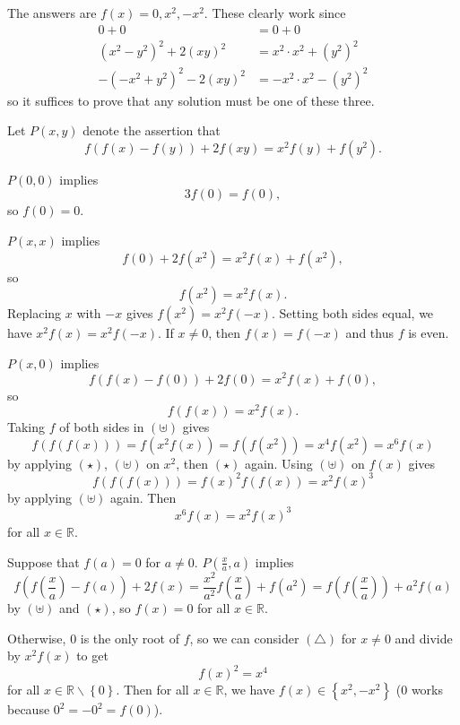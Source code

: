 The answers are $f\left(x\right)=\boxed{0,x^2,-x^2}$. These clearly work since
\begin{align*}
	0+0&=0+0\\
	\left(x^2-y^2\right)^2+2\left(xy\right)^2&=x^2\cdot x^2+\left(y^2\right)^2\\
	-\left(-x^2+y^2\right)^2-2\left(xy\right)^2&=-x^2\cdot x^2-\left(y^2\right)^2
\end{align*}
so it suffices to prove that any solution must be one of these three.

Let $P\left(x,y\right)$ denote the assertion that \[f\left(f\left(x\right)-f\left(y\right)\right)+2f\left(xy\right)=x^2f\left(y\right)+f\left(y^2\right).\]

$P\left(0,0\right)$ implies \[3f\left(0\right)=f\left(0\right),\] so $f\left(0\right)=0$.

$P\left(x,x\right)$ implies \[f\left(0\right)+2f\left(x^2\right)=x^2f\left(x\right)+f\left(x^2\right),\] so \[f\left(x^2\right)=x^2f\left(x\right).\tag{$\star$}\] Replacing $x$ with $-x$ gives $f\left(x^2\right)=x^2f\left(-x\right)$. Setting both sides equal, we have $x^2f\left(x\right)=x^2f\left(-x\right)$. If $x\neq0$, then $f\left(x\right)=f\left(-x\right)$ and thus $f$ is even.

$P\left(x,0\right)$ implies \[f\left(f\left(x\right)-f\left(0\right)\right)+2f\left(0\right)=x^2f\left(x\right)+f\left(0\right),\] so \[f\left(f\left(x\right)\right)=x^2f\left(x\right)\tag{$\uplus$}.\] Taking $f$ of both sides in $(\uplus)$ gives \[f\left(f\left(f\left(x\right)\right)\right)=f\left(x^2f\left(x\right)\right)=f\left(f\left(x^2\right)\right)=x^4f\left(x^2\right)=x^6f\left(x\right)\] by applying $(\star)$, $(\uplus)$ on $x^2$, then $(\star)$ again. Using $(\uplus)$ on $f\left(x\right)$ gives \[f\left(f\left(f\left(x\right)\right)\right)=f\left(x\right)^2f\left(f\left(x\right)\right)=x^2f\left(x\right)^3\] by applying $(\uplus)$ again. Then \[x^6f\left(x\right)=x^2f\left(x\right)^3\tag{$\triangle$}\] for all $x\in\mathbb{R}$.

Suppose that $f\left(a\right)=0$ for $a\neq0$. $P\left(\frac{x}{a},a\right)$ implies \[f\left(f\left(\frac{x}{a}\right)-f\left(a\right)\right)+2f\left(x\right)=\frac{x^2}{a^2}f\left(\frac{x}{a}\right)+f\left(a^2\right)=f\left(f\left(\frac{x}{a}\right)\right)+a^2f\left(a\right)\] by $(\uplus)$ and $(\star)$, so $f\left(x\right)=0$ for all $x\in\mathbb{R}$.

Otherwise, $0$ is the only root of $f$, so we can consider $(\triangle)$ for $x\neq0$ and divide by $x^2f\left(x\right)$ to get \[f\left(x\right)^2=x^4\] for all $x\in\mathbb{R}\backslash\left\{0\right\}$. Then for all $x\in\mathbb{R}$, we have $f\left(x\right)\in\left\{x^2,-x^2\right\}$ ($0$ works because $0^2=-0^2=f\left(0\right)$).

